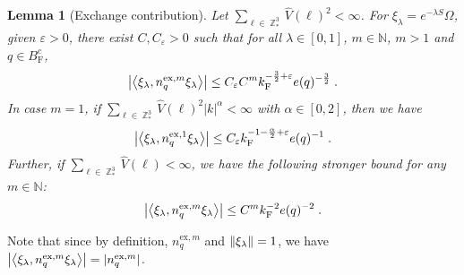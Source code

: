 \documentclass[12pt,a4paper]{article}
\numberwithin{equation}{section}
\newcommand{\NNN}{\mathbb{N}}
\newcommand{\1}{\mathbb{I}}
\newcommand{\ex}{\mathrm{ex}}
\newcommand{\F}{\mathrm{F}}
\DeclareMathOperator{\Z}{\mathbb{Z}}
\newcommand{\eva}[1]{\left\langle #1 \right\rangle}
\theoremstyle{plain}
\newtheorem{lemma}[theorem]{Lemma}
\theoremstyle{definition}
\theoremstyle{remark}
\theoremstyle{plain}
\theoremstyle{definition}
\theoremstyle{remark}
\begin{document}
\begin{lemma}[Exchange contribution] \label{lem:estnqex}
Let $ \sum_{\ell \in \Z^3_*} \hat{V}(\ell)^2 < \infty $. For $\xi_\lambda = e^{-\lambda S} \Omega$, given $ \varepsilon > 0 $, there exist $ C, C_\varepsilon > 0 $ such that for all $ \lambda \in [0,1] $, $ m \in \NNN $, $ m > 1 $ and $ q \in B_{\F}^c $,
\begin{equation}
	\abs{\eva{\xi_\lambda, n_q^{\ex,m} \xi_\lambda }}
	\leq C_\varepsilon C^m k_{\F}^{-\frac 32 + \varepsilon} e(q)^{-\frac 32} \;. \label{eq:estnqex_Coulomb}
\end{equation}
In case $ m = 1 $, if $ \sum_{\ell \in \Z^3_*} \hat{V}(\ell)^2 |k|^\alpha < \infty $ with $ \alpha \in [0,2] $, then we have
\begin{equation}
	\abs{\eva{\xi_\lambda, n_q^{\ex,1} \xi_\lambda }}
	\leq C_\varepsilon k_{\F}^{-1 - \frac{\alpha}{2} + \varepsilon} e(q)^{-1} \;. \label{eq:estnqex_Coulomb_1}
\end{equation}
Further, if $ \sum_{\ell \in \Z^3_*} \hat{V}(\ell) < \infty $, we have the following stronger bound for any $ m \in \mathbb{N} $:
\begin{equation}
	\abs{\eva{\xi_\lambda, n_q^{\ex,m} \xi_\lambda }}
	\leq C^m k_{\F}^{-2} e(q)^{-2} \;. \label{eq:estnqex}
\end{equation}
\end{lemma}

Note that since by definition, $ n_q^{\ex,m} $ and $ \norm{\xi_\lambda} = 1 $, we have $ \abs{\eva{\xi_\lambda, n_q^{\ex,m} \xi_\lambda }} = |n_q^{\ex,m}| $.
\end{document}
